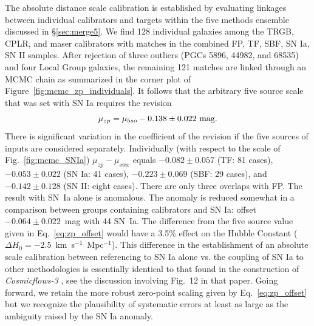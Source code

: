 \documentclass[twocolumn]{aastex63}
\newcommand{\kmsMpc}{\mbox{km s$^{-1}$ Mpc$^{-1}$}}
\begin{document}
The absolute distance scale calibration is established by evaluating linkages between individual calibrators and targets within the five methods ensemble discussed in \S \ref{sec:merge5}. 
  We find 128 individual galaxies among the TRGB, CPLR, and maser calibrators with matches in the combined FP, TF, SBF, SN Ia, SN II samples.  After rejection of three outliers (PGCs 5896, 44982, and 68535) and four Local Group galaxies, the remaining 121 matches are linked through an MCMC chain as summarized in the corner plot of Figure~\ref{fig:mcmc_zp_individuals}. 
  It follows that the arbitrary five source scale that was set with SN Ia requires the revision 
  \begin{equation}
  \mu_{zp} = \mu_{5so} - 0.138
  \pm0.022~\rm{mag}. 
  \label{eq:zp_offset}
  \end{equation}
There is significant variation in the coefficient of the revision if the five sources of inputs are considered separately.  Individually (with respect to the scale of Fig.~\ref{fig:mcmc_SNIa}) $\mu_{zp} - \mu_{xxx}$ equals $-0.082\pm0.057$ (TF: 81 cases), $-0.053\pm0.022$ (SN Ia: 41 cases), $-0.223\pm0.069$ (SBF: 29 cases), and $-0.142\pm0.128$ (SN II: eight cases).  There are only three overlaps with FP.  The result with SN~Ia alone is anomalous.  The anomaly is reduced somewhat in a comparison between groups containing calibrators and SN Ia: offset $-0.064\pm0.022$~mag with 44 SN~Ia.  
The difference from the five source value given in Eq.~\ref{eq:zp_offset} would have a 3.5\% effect on the Hubble Constant ($\Delta H_0 = -2.5$~\kmsMpc).  This difference in the establishment of an absolute scale calibration between referencing to SN Ia alone vs. the coupling of SN Ia to other methodologies
is essentially identical to that found in the construction of {\it Cosmicflows-3} \citep{2016AJ....152...50T}, see the discussion involving Fig.~12 in that paper.  Going forward, we retain the more robust zero-point scaling given by Eq.~\ref{eq:zp_offset} but we recognize the plausibility of systematic errors at least as large as the ambiguity raised by the SN Ia anomaly. 


\end{document}
